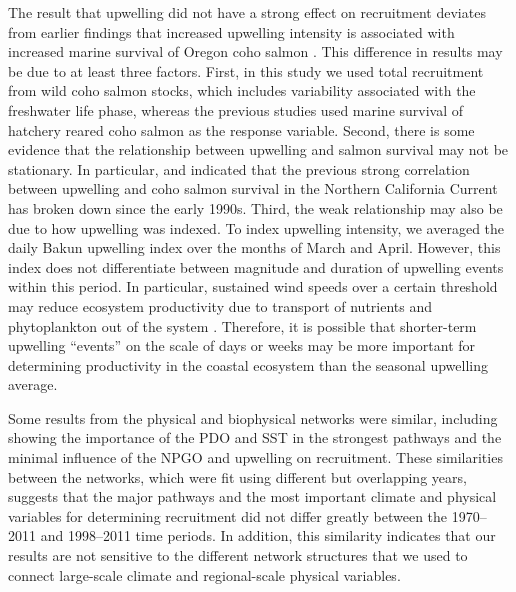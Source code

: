 The result that upwelling did not have a strong effect on recruitment deviates
from earlier findings that increased upwelling intensity is associated with
increased marine survival of Oregon coho salmon \citep{Fisher1988a,
Logerwell2003a}. This difference in results may be due to at least three
factors. First, in this study we used total recruitment from wild coho salmon
stocks, which includes variability associated with the freshwater life phase,
whereas the previous studies used marine survival of hatchery reared coho salmon
as the response variable. Second, there is some evidence that the relationship
between upwelling and salmon survival may not be stationary. In particular,
\citet{Botsford2002} and \citet{Pearcy1997} indicated that the previous strong
correlation between upwelling and coho salmon survival in the Northern
California Current has broken down since the early 1990s.  Third, the weak
relationship may also be due to how upwelling was indexed. To index upwelling
intensity, we averaged the daily Bakun upwelling index over the months of March
and April. However, this index does not differentiate between magnitude and
duration of upwelling events within this period. In particular, sustained wind
speeds over a certain threshold may reduce ecosystem productivity due to
transport of nutrients and phytoplankton out of the system \citep{Botsford2006,
Botsford2003}. Therefore, it is possible that shorter-term upwelling ``events''
on the scale of days or weeks may be more important for determining productivity
in the coastal ecosystem than the seasonal upwelling average.

Some results from the physical and biophysical networks were similar, including
showing the importance of the PDO and SST in the strongest pathways and the
minimal influence of the NPGO and upwelling on recruitment. These similarities
between the networks, which were fit using different but overlapping years,
suggests that the major pathways and the most important climate and physical
variables for determining recruitment did not differ greatly between the
1970--2011 and 1998--2011 time periods. In addition, this similarity indicates
that our results are not sensitive to the different network structures that we
used to connect large-scale climate and regional-scale physical variables.

